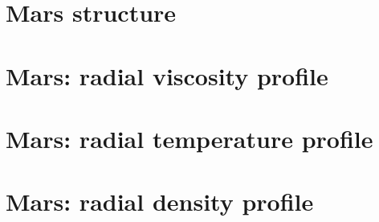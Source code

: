 \newpage %
\section{Mars structure} 
\newpage %
\section{Mars: radial viscosity profile} 
\newpage %
\section{Mars: radial temperature profile} 
\newpage %
\section{Mars: radial density profile} 

